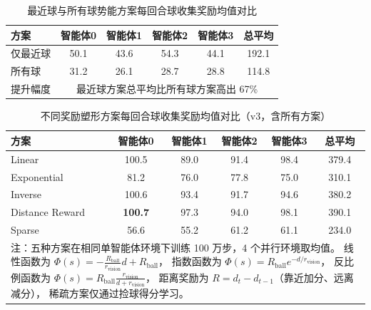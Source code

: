 \begin{table}[htbp]
  \centering
  \caption{ 最近球与所有球势能方案每回合球收集奖励均值对比}
  \label{tab:appendix_nearest_vs_all}
  \begin{tabular}{lcccc|c}
    \toprule
    方案 & 智能体0 & 智能体1 & 智能体2 & 智能体3 & 总平均 \\
    \midrule
    仅最近球 & 50.1 & 43.6 & 54.3 & 44.1 & 192.1 \\
    所有球 & 31.2 & 26.1 & 28.7 & 28.8 & 114.8 \\
    \midrule
    提升幅度 & \multicolumn{5}{c}{最近球方案总平均比所有球方案高出 67\%} \\
    \bottomrule
  \end{tabular}
\end{table}


\begin{table}[htbp]
  \centering
  \caption{ 不同奖励塑形方案每回合球收集奖励均值对比（v3，含所有方案）}
  \label{tab:appendix_potential_v3}
  \begin{tabular}{lcccc|c}
    \toprule
    方案 & 智能体0 & 智能体1 & 智能体2 & 智能体3 & 总平均 \\
    \midrule
    Linear & 100.5 & 89.0 & 91.4 & 98.4 & 379.4 \\
    Exponential & 81.2 & 76.0 & 77.8 & 75.0 & 310.1 \\
    Inverse & 100.6 & 93.4 & 91.7 & 94.6 & 380.2 \\
    Distance Reward &  \textbf{100.7} & 97.3 & 94.0 & 98.1 & 390.1 \\
    Sparse & 56.6 & 55.2 & 61.2 & 61.1 & 234.0 \\
    \midrule
    \multicolumn{6}{p{0.85\textwidth}}{%
      \small 注：五种方案在相同单智能体环境下训练 100 万步，4 个并行环境取均值。
      线性函数为 $\Phi(s)=-\frac{R_{\mathrm{ball}}}{r_{\mathrm{vision}}}d+R_{\mathrm{ball}}$，
      指数函数为 $\Phi(s)=R_{\mathrm{ball}}e^{-d/r_{\mathrm{vision}}}$，
      反比例函数为 $\Phi(s)=R_{\mathrm{ball}}\frac{r_{\mathrm{vision}}}{d+r_{\mathrm{vision}}}$，
      距离奖励为 $R=d_t-d_{t-1}$（靠近加分、远离减分），
      稀疏方案仅通过捡球得分学习。} \\
    \bottomrule
  \end{tabular}
\end{table}
